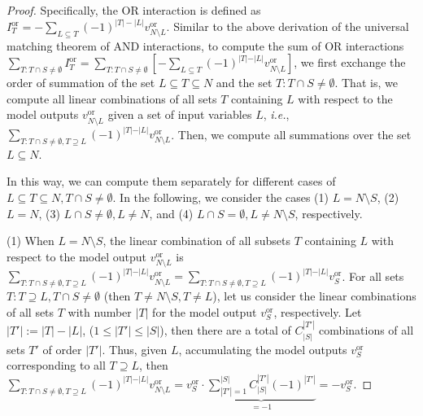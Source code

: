 \documentclass[10pt,twocolumn,letterpaper]{article}
\begin{document}
\begin{proof}
Specifically, the OR interaction is defined as \( I^{\text{or}}_T = -\sum\nolimits_{L \subseteq T} (-1)^{|T|-|L|} v^{\text{or}}_{N\setminus L} \).
Similar to the above derivation of the universal matching theorem of AND interactions, to compute the sum of OR interactions \( \sum\nolimits_{T:T \cap S \neq \emptyset} I^{\text{or}}_T = \sum\nolimits_{T:T \cap S \neq \emptyset} \left[- \sum\nolimits_{L \subseteq T} (-1)^{\vert T \vert - \vert L \vert} v^{\text{or}}_{N \setminus L} \right] \), we first exchange the order of summation of the set \( L\subseteq T \subseteq N \) and the set \( T:T \cap S \neq \emptyset \). That is, we compute all linear combinations of all sets \( T \) containing \( L \) with respect to the model outputs \( v^{\text{or}}_{N \setminus L} \) given a set of input variables \( L \), \textit{i.e.}, \( \sum\nolimits_{T: T \cap S \neq \emptyset, T \supseteq L} (-1)^{\vert T \vert - \vert L \vert} v^{\text{or}}_{N \setminus L} \). Then, we compute all summations over the set \( L\subseteq N \).

In this way, we can compute them separately for different cases of \( L\subseteq T\subseteq N, T \cap S \neq \emptyset \). In the following, we consider the cases (1) \( L = N \setminus S \), (2) \( L=N \), (3) \( L \cap S \neq \emptyset, L \neq N \), and (4) \( L \cap S=\emptyset, L \neq N \setminus S \), respectively.

(1) When \( L = N \setminus S \), the linear combination of all subsets \( T \) containing \( L \) with respect to the model output \( v^{\text{or}}_{N \setminus L} \) is \( \sum\nolimits_{T: T \cap S \neq \emptyset, T \supseteq L} (-1)^{\vert T \vert - \vert L \vert} v^{\text{or}}_{N \setminus L} = \sum\nolimits_{T: T \cap S \neq \emptyset, T \supseteq L} (-1)^{\vert T \vert - \vert L \vert} v^{\text{or}}_S \). For all sets \( T: T\supseteq L, T \cap S \neq \emptyset \) (then \( T \neq N \setminus S, T \neq L \)), let us consider the linear combinations of all sets \( T \) with number \( |T| \) for the model output \( v^{\text{or}}_S \), respectively. Let \( |T'| := |T| - |L| \), (\( 1\le |T'|\le |S| \)), then there are a total of \( C_{|S|}^{|T'|} \) combinations of all sets \( T' \) of order \( |T'| \).
Thus, given \( L \), accumulating the model outputs \( v^{\text{or}}_S \) corresponding to all \( T\supseteq L \), then \( \sum\nolimits_{T: T \cap S \neq \emptyset, T \supseteq L} (-1)^{\vert T \vert - \vert L \vert} v^{\text{or}}_{N \setminus L} = v^{\text{or}}_S \cdot \underbrace{\sum\nolimits_{|T'|=1}^{\vert S \vert } C_{|S|}^{|T'|} (-1)^{|T'|}}_{=-1} = -v^{\text{or}}_S \).


\end{proof}
\end{document}
